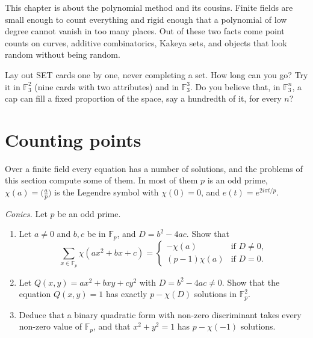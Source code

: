 This chapter is about the polynomial method and its cousins. Finite fields are small enough to count everything and rigid
enough that a polynomial of low degree cannot vanish in too many places. Out of these two facts come point counts on curves,
additive combinatorics, Kakeya sets, and objects that look random without being random.

\begin{think}
Lay out SET cards one by one, never completing a set. How long can you go? Try it in $\mathbb F_3^2$ (nine cards with two
attributes) and in $\mathbb F_3^3$. Do you believe that, in $\mathbb F_3^n$, a cap can fill a fixed proportion of the space,
say a hundredth of it, for every $n$?
\end{think}

\section{Counting points}

Over a finite field every equation has a number of solutions, and the problems of this section compute some of them. In most
of them $p$ is an odd prime, $\chi(a)=\bigl(\frac ap\bigr)$ is the Legendre symbol with $\chi(0)=0$, and $e(t)=e^{2i\pi t/p}$.

\begin{exercise}[$\star$]\label{pb:conics}
\emph{Conics.} Let $p$ be an odd prime.
\begin{enumerate}[label=(\alph*)]
\item Let $a\ne0$ and $b,c$ be in $\mathbb F_p$, and $D=b^2-4ac$. Show that
\[
\sum_{x\in\mathbb F_p}\chi(ax^2+bx+c)=\begin{cases}-\chi(a)&\text{if }D\ne0,\\(p-1)\chi(a)&\text{if }D=0.\end{cases}
\]
\item Let $Q(x,y)=ax^2+bxy+cy^2$ with $D=b^2-4ac\ne0$. Show that the equation $Q(x,y)=1$ has exactly $p-\chi(D)$ solutions in
$\mathbb F_p^2$.
\item Deduce that a binary quadratic form with non-zero discriminant takes every non-zero value of $\mathbb F_p$, and that
$x^2+y^2=1$ has $p-\chi(-1)$ solutions.
\end{enumerate}
\end{exercise}

